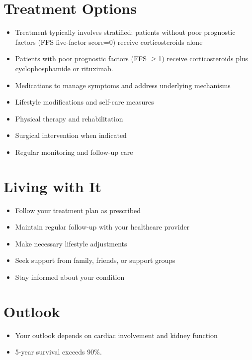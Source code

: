 \section{Treatment Options}
\begin{itemize}[noitemsep]
  \item Treatment typically involves stratified: patients without poor prognostic factors (FFS five-factor score=0) receive corticosteroids alone
  \item Patients with poor prognostic factors (FFS $\geq$1) receive corticosteroids plus cyclophosphamide or rituximab.
  \item Medications to manage symptoms and address underlying mechanisms
  \item Lifestyle modifications and self-care measures
  \item Physical therapy and rehabilitation
  \item Surgical intervention when indicated
  \item Regular monitoring and follow-up care
\end{itemize}
\section{Living with It}
\begin{itemize}[noitemsep]
  \item Follow your treatment plan as prescribed
  \item Maintain regular follow-up with your healthcare provider
  \item Make necessary lifestyle adjustments
  \item Seek support from family, friends, or support groups
  \item Stay informed about your condition
\end{itemize}
\section{Outlook}
\begin{itemize}[noitemsep]
  \item Your outlook depends on cardiac involvement and kidney function
  \item 5-year survival exceeds 90\%.
\end{itemize}
